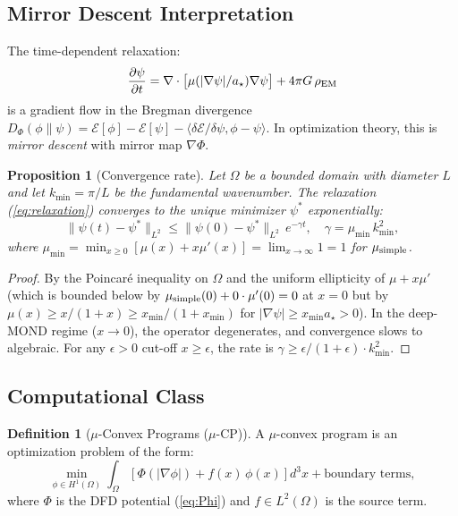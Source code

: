 \documentclass[11pt]{article}
\newtheorem{proposition}[theorem]{Proposition}
\theoremstyle{definition}
\newtheorem{definition}[theorem]{Definition}
\theoremstyle{remark}
\newcommand{\astar}{a_\star}
\begin{document}
\subsection{Mirror Descent Interpretation}

The time-dependent relaxation:
\begin{equation}
  \frac{\partial \psi}{\partial t} = \nabla \cdot
  \bigl[\mu(|\nabla\psi|/\astar)\nabla\psi\bigr]
  + 4\pi G\,\rho_{\rm EM}
  \label{eq:relaxation}
\end{equation}
is a gradient flow in the Bregman divergence $D_\Phi(\phi \| \psi)
= \mathcal{E}[\phi] - \mathcal{E}[\psi]
  - \langle \delta\mathcal{E}/\delta\psi, \phi - \psi \rangle$.
In optimization theory, this is \emph{mirror descent} with mirror
map $\nabla\Phi$.

\begin{proposition}[Convergence rate]
\label{prop:convergence}
Let $\Omega$ be a bounded domain with diameter $L$ and let
$k_{\min} = \pi/L$ be the fundamental wavenumber. The relaxation
(\ref{eq:relaxation}) converges to the unique minimizer $\psi^*$
exponentially:
\begin{equation}
  \|\psi(t) - \psi^*\|_{L^2} \leq
  \|\psi(0) - \psi^*\|_{L^2}\,
  e^{-\gamma t}, \quad
  \gamma = \mu_{\min}\,k_{\min}^2,
  \label{eq:conv-rate}
\end{equation}
where $\mu_{\min} = \min_{x \geq 0} [\mu(x) + x\mu'(x)]
= \lim_{x \to \infty} 1 = 1$ for $\mu_{\rm simple}$.
\end{proposition}

\begin{proof}
By the Poincar\'{e} inequality on $\Omega$ and the uniform ellipticity
of $\mu + x\mu'$ (which is bounded below by $\mu_{\rm simple}(0) +
0 \cdot \mu'(0) = 0$ at $x=0$ but by $\mu(x) \geq x/(1+x) \geq
x_{\min}/(1+x_{\min})$ for $|\nabla\psi| \geq x_{\min}\astar > 0$).
In the deep-MOND regime ($x \to 0$), the operator degenerates, and
convergence slows to algebraic. For any $\epsilon > 0$ cut-off
$x \geq \epsilon$, the rate is $\gamma \geq \epsilon/(1+\epsilon)
\cdot k_{\min}^2$.
\end{proof}

\subsection{Computational Class}

\begin{definition}[$\mu$-Convex Programs ($\mu$-CP)]
A $\mu$-convex program is an optimization problem of the form:
\begin{equation}
  \min_{\phi \in H^1(\Omega)} \int_\Omega \left[
    \Phi(|\nabla\phi|) + f(x)\,\phi(x)
  \right] d^3x
  + \text{boundary terms},
  \label{eq:mu-CP}
\end{equation}
where $\Phi$ is the DFD potential (\ref{eq:Phi}) and $f \in L^2(\Omega)$
is the source term.
\end{definition}
\end{document}
